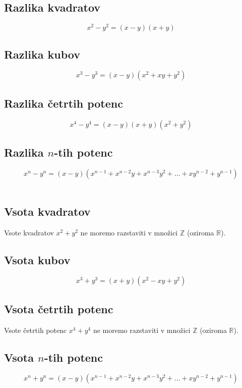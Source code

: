         \subsection*{Razlika kvadratov}
        $$x^2-y^2=(x-y)(x+y)$$
    

        \subsection*{Razlika kubov}
        $$ x^3-y^3=(x-y)(x^2+xy+y^2) $$
    

        \subsection*{Razlika četrtih potenc}
        $$x^4-y^4=(x-y)(x+y)(x^2+y^2)$$
    

        \subsection*{Razlika $n$-tih potenc}
        $$x^n-y^n=(x-y)(x^{n-1}+x^{n-2}y+x^{n-3}y^2+\ldots+xy^{n-2}+y^{n-1})$$
        ~\newline
    
        
        \subsection*{Vsota kvadratov}
        Vsote kvadratov $x^2+y^2$ ne moremo razstaviti v množici $\mathbb{Z}$ (oziroma $\mathbb{R}$).
    
    
        \subsection*{Vsota kubov}
        $$ x^3+y^3=(x+y)(x^2-xy+y^2) $$
        

        \subsection*{Vsota četrtih potenc}
        Vsote četrtih potenc $x^4+y^4$ ne moremo razstaviti v množici $\mathbb{Z}$ (oziroma $\mathbb{R}$).
    

        \subsection*{Vsota $n$-tih potenc}
        $$x^n+y^n=(x-y)(x^{n-1}+x^{n-2}y+x^{n-3}y^2+\ldots+xy^{n-2}+y^{n-1})$$
            ~\newline
    
